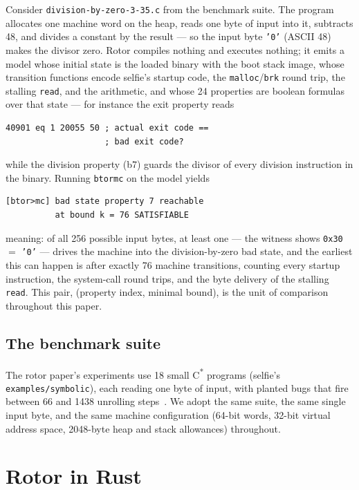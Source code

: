 \documentclass[sigplan,screen,nonacm]{acmart}
\begin{document}
Consider \texttt{division-by-zero-3-35.c} from the benchmark suite. The
program allocates one machine word on the heap, reads one byte of input
into it, subtracts 48, and divides a constant by the result --- so the
input byte \texttt{'0'} (ASCII 48) makes the divisor zero. Rotor
compiles nothing and executes nothing; it emits a model whose initial
state is the loaded binary with the boot stack image, whose transition
functions encode selfie's startup code, the \texttt{malloc}/\texttt{brk}
round trip, the stalling \texttt{read}, and the arithmetic, and whose
24 properties are boolean formulas over that state --- for instance the
exit property reads
\begin{lstlisting}
40901 eq 1 20055 50 ; actual exit code ==
                    ; bad exit code?
\end{lstlisting}
\noindent while the division property (b7) guards the divisor of every
division instruction in the binary. Running \texttt{btormc} on the
model yields
\begin{lstlisting}
[btor>mc] bad state property 7 reachable
          at bound k = 76 SATISFIABLE
\end{lstlisting}
\noindent meaning: of all 256 possible input bytes, at least one ---
the witness shows \texttt{0x30} $=$ \texttt{'0'} --- drives the machine
into the division-by-zero bad state, and the earliest this can happen
is after exactly 76 machine transitions, counting every startup
instruction, the system-call round trips, and the byte delivery of the
stalling \texttt{read}. This pair, (property index, minimal bound), is
the unit of comparison throughout this paper.

\subsection{The benchmark suite}

The rotor paper's experiments use 18 small C\textsuperscript{*} programs
(selfie's \texttt{examples/symbolic}), each reading one byte of input,
with planted bugs that fire between 66 and 1438 unrolling
steps~\cite{rotorpaper}. We adopt the same suite, the same single input
byte, and the same machine configuration (64-bit words, 32-bit virtual
address space, 2048-byte heap and stack allowances) throughout.

\section{Rotor in Rust}
\label{sec:rust}
\end{document}
